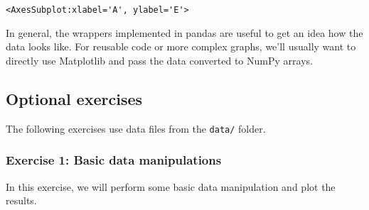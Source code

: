 \documentclass{scrartcl}
\makeatletter
\newcommand{\boxspacing}{\kern\kvtcb@left@rule\kern\kvtcb@boxsep}
\newcommand{\prompt}[4]{
        {\ttfamily\llap{{\color{#2}[#3]:\hspace{3pt}#4}}\vspace{-\baselineskip}}
    }
\makeatother
\begin{document}
            \begin{tcolorbox}[breakable, size=fbox, boxrule=.5pt, pad at break*=1mm, opacityfill=0]
\prompt{Out}{outcolor}{38}{\boxspacing}
\begin{Verbatim}[commandchars=\\\{\}]
<AxesSubplot:xlabel='A', ylabel='E'>
\end{Verbatim}
\end{tcolorbox}
        
    \begin{center}
    \end{center}
    
    In general, the wrappers implemented in pandas are useful to get an idea
how the data looks like. For reusable code or more complex graphs, we'll
usually want to directly use Matplotlib and pass the data converted to
NumPy arrays.


\hypertarget{exercises}{%
\subsection{Optional exercises}\label{exercises}}

The following exercises use data files from the \texttt{data/} folder.

    \hypertarget{exercise-1-basic-data-manipulations}{%
\subsubsection{Exercise 1: Basic data
manipulations}\label{exercise-1-basic-data-manipulations}}

In this exercise, we will perform some basic data manipulation and plot
the results.
\end{document}
